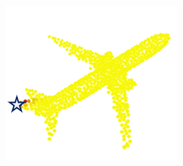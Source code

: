 \documentclass[letterpaper]{article} %
\begin{document}
\begin{figure}[htbp]
\begin{center}
\begin{minipage}[b]{0.8\linewidth}
\begin{center}
\begin{minipage}[b]{0.12\linewidth}
\begin{center}
\end{center}
\end{minipage}\\
\begin{minipage}[b]{0.15\linewidth}
\begin{center}
\end{center}
\end{minipage}
\begin{minipage}[b]{0.12\linewidth}
\begin{center}
\includegraphics[width=1.0\linewidth]{images/atten_pic/dgcnn_airplane_feature_1.png}
\end{center}
\end{minipage}
\begin{minipage}[b]{0.12\linewidth}
\begin{center}

\end{center}
\end{minipage}
\end{center}
\end{minipage}
\end{center}
\end{figure}
\end{document}
